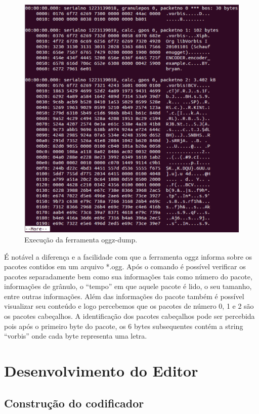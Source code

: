  \begin{figure}[ht]
	\centering
		\includegraphics[keepaspectratio=true,scale=0.5]{figuras/oggz-dump.eps}
	\caption{Execução da ferramenta oggz-dump.}
	\label{oggzdump}
\end{figure}

É notável a diferença e a facilidade com que a ferramenta oggz informa sobre os pacotes contidos em um arquivo *.ogg. Após o comando é possível verificar os pacotes separadamente bem como sua informações tais como número do pacote, informações de grânulo, o ``tempo'' em que aquele pacote é lido, o seu tamanho, entre outras informações. Além das informações do pacote também é possível visualizar seu conteúdo e logo percebemos que os pacotes de número 0, 1 e 2 são os pacotes cabeçalhos. A identificação dos pacotes cabeçalhos pode ser percebida pois após o primeiro byte do pacote, os 6 bytes subsequentes contém a string ``vorbis'' onde cada byte representa uma letra.

\section{Desenvolvimento do Editor}

\subsection{Construção do codificador}

